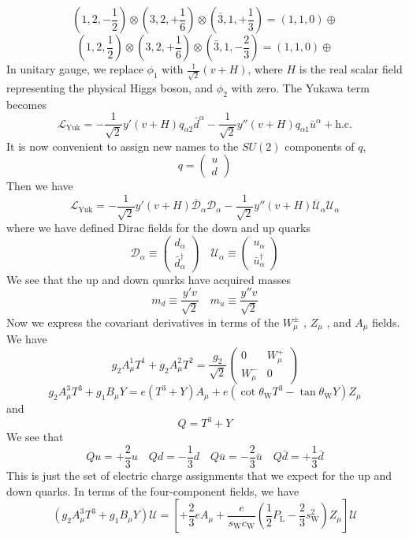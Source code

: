 \[(1,2,-\frac{1}{2}) \otimes (3, 2, +\frac{1}{6}) \otimes (\bar{3}, 1, +\frac{1}{3}) = (1,1,0) \oplus\]
\[(1,2, \frac{1}{2}) \otimes (3, 2, +\frac{1}{6}) \otimes (\bar{3}, 1, -\frac{2}{3}) = (1,1,0) \oplus\]
In unitary gauge, we replace $\phi_1$ with $\frac{1}{\sqrt{2}}(v+H)$, where $H$ is the real scalar field representing the physical Higgs boson, and $\phi_2$ with zero. The Yukawa term becomes
\[\mathcal{L}_{\mathrm{Yuk}} = -\frac{1}{\sqrt{2}}y'(v+H)q_{\alpha 2}\bar{d}^{\alpha} - \frac{1}{\sqrt{2}}y''(v+H)q_{\alpha 1}\bar{u}^{\alpha} + \mathrm{h.c.}\]
It is now convenient to assign new names to the $SU(2)$ components of $q$,
\[q = \begin{pmatrix}
u \\ d
\end{pmatrix} \]
Then we have
\[\mathcal{L}_{\mathrm{Yuk}} = -\frac{1}{\sqrt{2}}y'(v+H) \overline{\mathcal{D}}_{\alpha}\mathcal{D}_{\alpha} -\frac{1}{\sqrt{2}}y''(v+H) \overline{\mathcal{U}}_{\alpha}\mathcal{U}_{\alpha}\]
where we have defined Dirac fields for the down and up quarks
\[\mathcal{D}_{\alpha} \equiv \begin{pmatrix}
d_{\alpha} \\ \bar{d}^{\dagger}_{\alpha}
\end{pmatrix} \quad  \mathcal{U}_{\alpha} \equiv \begin{pmatrix}
u_{\alpha} \\ \bar{u}^{\dagger}_{\alpha}
\end{pmatrix}\]
We see  that the up and down quarks have acquired masses
\[m_d \equiv \frac{y'v}{\sqrt{2}} \quad m_u \equiv \frac{y''v}{\sqrt{2}}\]
Now we express the covariant derivatives in terms of the $W_{\mu}^{\pm}$ , $Z_{\mu}$ , and $A_{\mu}$ fields. We have
\[g_2 A^1_{\mu}T^1 + g_2 A^2_{\mu}T^2 = \frac{g_2}{\sqrt{2}} \begin{pmatrix}
0 & W_{\mu}^+ \\ W^{-}_{\mu} & 0
\end{pmatrix} \]
\[g_2A^3_{\mu}T^3 + g_1 B_{\mu} Y = e(T^3+Y)A_{\mu} + e(\cot\theta_{\mathrm{W}} T^3 - \tan\theta_{\mathrm{W}} Y)Z_{\mu}\]
and
\[Q = T^3 + Y\]
We see that
\[Qu = +\frac{2}{3}u \quad Qd = -\frac{1}{3}d \quad Q\bar{u} = -\frac{2}{3}\bar{u} \quad Q\bar{d} = +\frac{1}{3}\bar{d}\]
This is just the set of electric charge assignments that we expect for the up and down quarks. In terms of the four-component fields, we have
\[(g_2A^3_{\mu}T^3 + g_1 B_{\mu} Y) \mathcal{U} = \left[ + \frac{2}{3}eA_{\mu} + \frac{e}{s_{\mathrm{W}} c_{\mathrm{W}}}( \frac{1}{2}P_{\mathrm{L}} -\frac{2}{3}  s_{\mathrm{W}}^2)Z_{\mu} \right] \mathcal{U}\]
